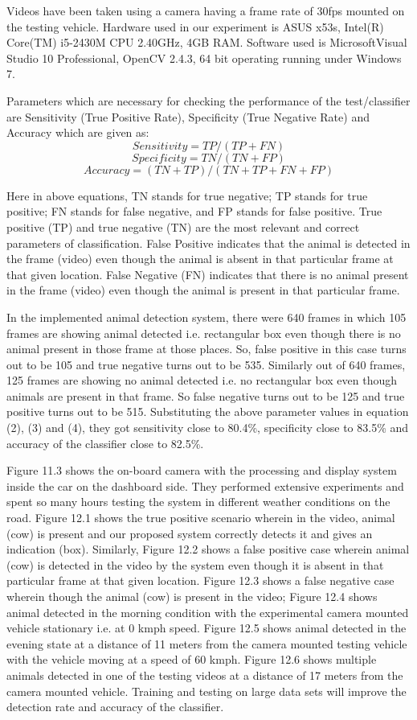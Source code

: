 \documentclass[14pt,a4paper,final]{extreport}
\begin{document}
Videos have been taken using a camera having a frame rate of 30fps mounted on the testing vehicle. Hardware used in our experiment is ASUS x53s, Intel(R) Core(TM) i5-2430M CPU 2.40GHz, 4GB RAM. Software used is MicrosoftVisual Studio 10 Professional, OpenCV 2.4.3, 64 bit operating running under Windows 7.

Parameters which are necessary for checking the performance of the test/classifier are Sensitivity (True Positive Rate), Specificity (True Negative Rate) and Accuracy which are given as:
\newline \textbf {\[Sensitivity=TP/(TP + FN)\] } 
\textbf{\[Specificity=TN/(TN + FP) \]}
\textbf{\[Accuracy=(TN + TP)/(TN + TP + FN + FP)\] }
 \item Here in above equations, TN stands for true negative; TP stands for true positive; FN stands for false negative, and FP stands for false positive. True positive (TP) and true negative (TN) are the most relevant and correct parameters of classification. False Positive indicates that the animal is detected in the frame (video) even though the animal is absent in that particular frame at that given location. False Negative (FN) indicates that there is no animal present in the frame (video) even though the animal is present in that particular frame.

In the implemented animal detection system, there were 640 frames in which 105 frames are showing animal detected i.e. rectangular box even though there is no animal present in those frame at those places. So, false positive in this case turns out to be 105 and true negative turns out to be 535. Similarly out of 640 frames, 125 frames are showing no animal detected i.e. no rectangular box even though animals are present in that frame. So false negative turns out to be 125 and true positive turns out to be 515. Substituting the above parameter values in equation (2), (3) and (4), they got sensitivity close to 80.4\%, specificity close to 83.5\% and accuracy of the classifier close to 82.5\%.

Figure 11.3 shows the on-board camera with the processing and display system inside the car on the dashboard side. They performed extensive experiments and spent so many hours testing the system in different weather conditions on the road. Figure 12.1 shows the true positive scenario wherein in the video, animal (cow) is present and our proposed system correctly detects it and gives an indication (box). Similarly, Figure 12.2  shows a false positive case wherein animal (cow) is detected in the video by the system even though it is absent in that particular frame at that given location. Figure 12.3 shows a false negative case wherein though the animal (cow) is present in the video; Figure 12.4  shows animal detected in the morning condition with the experimental camera mounted vehicle stationary i.e. at 0 kmph speed. Figure 12.5 shows animal detected in the evening state at a distance of 11 meters from the camera mounted testing vehicle with the vehicle moving at a speed of 60 kmph. Figure 12.6 shows multiple animals detected in one of the testing videos at a distance of 17 meters from the camera mounted vehicle. Training and testing on large data sets will improve the detection rate and accuracy of the classifier.
\end{document}
